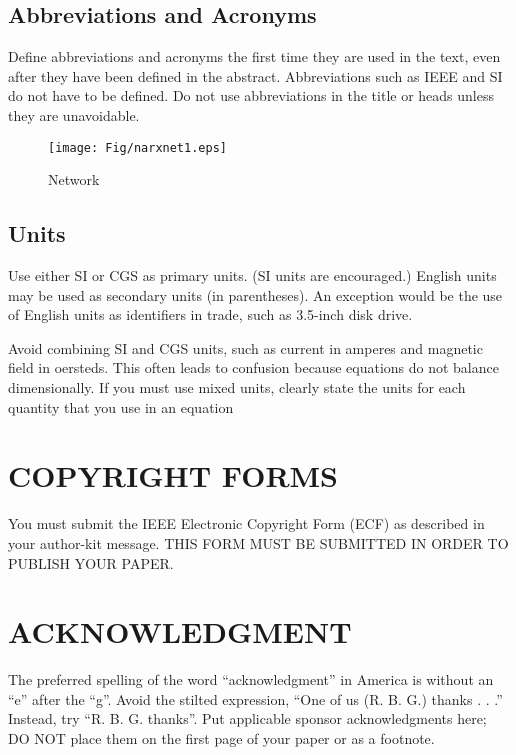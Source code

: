 \documentclass[journal]{IEEEtran}
\begin{document}
\subsection{Abbreviations and Acronyms }

Define abbreviations and acronyms the first time they are used in the text, even after they have been defined in the abstract. Abbreviations such as IEEE and SI do not have to be defined. Do not use abbreviations in the title or heads unless they are unavoidable.

\begin{figure}[t]
	\centerline{\texttt{[image: Fig/narxnet1.eps]}}
	\caption{Network}
	\label{fig:1}
\end{figure}


\subsection{Units}

Use either SI or CGS as primary units. (SI units are encouraged.) English units may be used as secondary units (in parentheses). An exception would be the use of English units as identifiers in trade, such as 3.5-inch disk drive.

Avoid combining SI and CGS units, such as current in amperes and magnetic field in oersteds. This often leads to confusion because equations do not balance dimensionally. If you must use mixed units, clearly state the units for each quantity that you use in an equation


\section{COPYRIGHT FORMS}

You must submit the IEEE Electronic Copyright Form (ECF) as described in your author-kit message. THIS FORM MUST BE SUBMITTED IN ORDER TO PUBLISH YOUR PAPER.
\section{ACKNOWLEDGMENT}

The preferred spelling of the word “acknowledgment” in America is without an “e” after the “g”. Avoid the stilted expression, “One of us (R. B. G.) thanks . . .”  Instead, try
“R. B. G. thanks”. Put applicable sponsor acknowledgments here; DO NOT place them on the first page of your paper or as a footnote.


%
%
\end{document}
